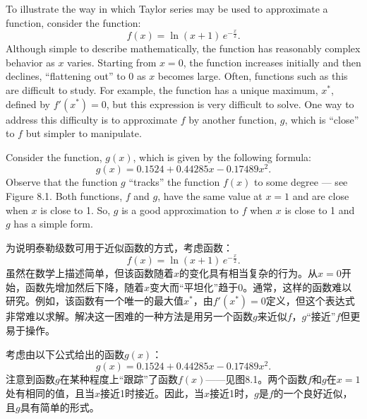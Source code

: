 \begin{original}
To illustrate the way in which Taylor series may be used to approximate a function, consider the function:
\[
f(x) = \ln(x + 1) \, e^{-\frac{x}{2}}.
\]
Although simple to describe mathematically, the function has reasonably complex behavior as $x$ varies. Starting from $x = 0$, the function increases initially and then declines, ``flattening out'' to 0 as $x$ becomes large. Often, functions such as this are difficult to study. For example, the function has a unique maximum, $x^*$, defined by $f'(x^*) = 0$, but this expression is very difficult to solve. One way to address this difficulty is to approximate $f$ by another function, $g$, which is ``close'' to $f$ but simpler to manipulate.

Consider the function, $g(x)$, which is given by the following formula:
\[
g(x) = 0.1524 + 0.44285x - 0.17489x^2.
\]
Observe that the function $g$ ``tracks'' the function $f(x)$ to some degree --- see Figure 8.1. Both functions, $f$ and $g$, have the same value at $x = 1$ and are close when $x$ is close to 1. So, $g$ is a good approximation to $f$ when $x$ is close to 1 and $g$ has a simple form.
\end{original}
\begin{translation}
为说明泰勒级数可用于近似函数的方式，考虑函数：
\[
f(x) = \ln(x + 1) \, e^{-\frac{x}{2}}.
\]
虽然在数学上描述简单，但该函数随着$x$的变化具有相当复杂的行为。从$x = 0$开始，函数先增加然后下降，随着$x$变大而``平坦化''趋于0。通常，这样的函数难以研究。例如，该函数有一个唯一的最大值$x^*$，由$f'(x^*) = 0$定义，但这个表达式非常难以求解。解决这一困难的一种方法是用另一个函数$g$来近似$f$，$g$``接近''$f$但更易于操作。

考虑由以下公式给出的函数$g(x)$：
\[
g(x) = 0.1524 + 0.44285x - 0.17489x^2.
\]
注意到函数$g$在某种程度上``跟踪''了函数$f(x)$——见图8.1。两个函数$f$和$g$在$x = 1$处有相同的值，且当$x$接近1时接近。因此，当$x$接近1时，$g$是$f$的一个良好近似，且$g$具有简单的形式。
\end{translation}

